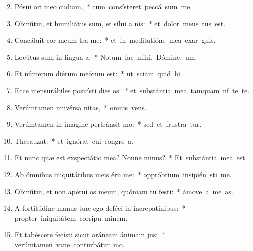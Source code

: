 \begin{flushleft}
\begin{enumerate}[leftmargin=*]
\setcounter{enumi}{1}

\item Pósui ori meo cudiam,~* \mbox{cum consísteret peccá sum me.}
\item Obmútui, et humiliátus sum, et sílui a nis:~* \mbox{et dolor meus tus est.}
\item Concáluit cor meum tra me:~* \mbox{et in meditatióne mea exar gnis.}
\item Locútus sum in lingua a:~* \mbox{Notum fac mihi, Dómine,  um.}
\item Et númerum diérum meórum  est:~* \mbox{ut sciam quid  hi.}
\item Ecce mensurábiles posuísti dies os:~* \mbox{et substántia mea tamquam ní te te.}
\item Verúmtamen univérsa nitas,~* \mbox{omnis  vens.}
\item Verúmtamen in imágine pertránsit mo:~* \mbox{sed et frustra tur.}
\item Thesauzat:~* \mbox{et ignórat cui congre a.}
\item Et nunc quæ est exspectátio mea? Nonne minus?~* \mbox{Et substántia mea   est.}
\item Ab ómnibus iniquitátibus meis éru me:~* \mbox{oppróbrium insipién sti me.}
\item Obmútui, et non apérui os meum, quóniam tu festi:~* \mbox{ámove a me  as.}
\item A fortitúdine manus tuæ ego deféci in increpatinibus:~* \mbox{propter iniquitátem corripu minem.}
\item Et tabéscere fecísti sicut aráneam ánimam jus:~* \mbox{verúmtamen vane conturbátur  mo.}

\end{enumerate}
\end{flushleft}
